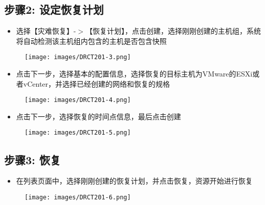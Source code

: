 \subsection{步骤2: 设定恢复计划}
\label{步骤2:设定恢复计划}

\begin{itemize}
\item 选择【灾难恢复】-$>$【恢复计划】，点击创建，选择刚刚创建的主机组，系统将自动检测该主机组内包含的主机是否包含快照

\end{itemize}

\begin{figure}[htbp]
\centering
\texttt{[image: images/DRCT201-3.png]}
\end{figure}

\begin{itemize}
\item 点击下一步，选择基本的配置信息，选择恢复的目标主机为VMware的ESXi或者vCenter，并选择已经创建的网络和恢复的规格

\end{itemize}

\begin{figure}[htbp]
\centering
\texttt{[image: images/DRCT201-4.png]}
\end{figure}

\begin{itemize}
\item 点击下一步，选择恢复的时间点信息，最后点击创建

\end{itemize}

\begin{figure}[htbp]
\centering
\texttt{[image: images/DRCT201-5.png]}
\end{figure}

\subsection{步骤3: 恢复}
\label{步骤3:恢复}

\begin{itemize}
\item 在列表页面中，选择刚刚创建的恢复计划，并点击恢复，资源开始进行恢复

\end{itemize}

\begin{figure}[htbp]
\centering
\texttt{[image: images/DRCT201-6.png]}
\end{figure}

